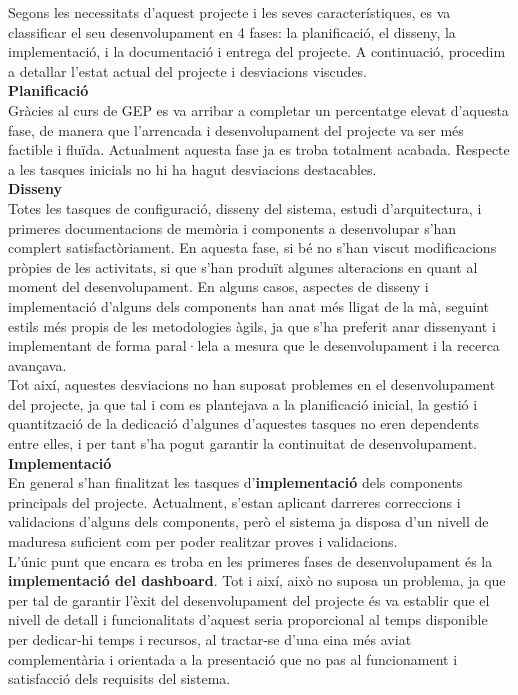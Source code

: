 Segons les necessitats d’aquest projecte i les seves característiques, es va classificar el seu desenvolupament en 4 fases: la planificació, el disseny, la implementació, i la documentació i entrega del projecte. A continuació, procedim a detallar l'estat actual del projecte i desviacions viscudes.\\

\textbf{Planificació}\\

Gràcies al curs de GEP es va arribar a completar un percentatge elevat d'aquesta fase, de manera que l'arrencada i desenvolupament del projecte va ser més factible i fluïda. Actualment aquesta fase ja es troba totalment acabada. Respecte a les tasques inicials no hi ha hagut desviacions destacables.\\

\textbf{Disseny}\\

Totes les tasques de configuració, disseny del sistema, estudi d'arquitectura, i primeres documentacions de memòria i components a desenvolupar s'han complert satisfactòriament. En aquesta fase, si bé no s'han viscut modificacions pròpies de les activitats, si que s'han produït algunes alteracions en quant al moment del desenvolupament. En alguns casos, aspectes de disseny i implementació d'alguns dels components han anat més lligat de la mà, seguint estils més propis de les metodologies àgils, ja que s'ha preferit anar dissenyant i implementant de forma paral·lela a mesura que le desenvolupament i la recerca avançava.\\

Tot així, aquestes desviacions no han suposat problemes en el desenvolupament del projecte, ja que tal i com es plantejava a la planificació inicial, la gestió i quantització de la dedicació d'algunes d'aquestes tasques no eren dependents entre elles, i per tant s'ha pogut garantir la continuitat de desenvolupament.\\

\textbf{Implementació}\\

En general s'han finalitzat les tasques d'\textbf{implementació} dels components principals del projecte. Actualment, s'estan aplicant darreres correccions i validacions d'alguns dels components, però el sistema ja disposa d'un nivell de maduresa suficient com per poder realitzar proves i validacions.\\

L'únic punt que encara es troba en les primeres fases de desenvolupament és la \textbf{implementació del dashboard}. Tot i així, això no suposa un problema, ja que per tal de garantir l'èxit del desenvolupament del projecte és va establir que el nivell de detall i funcionalitats d'aquest seria proporcional al temps disponible per dedicar-hi temps i recursos, al tractar-se d'una eina més aviat complementària i orientada a la presentació que no pas al funcionament i satisfacció dels requisits del sistema.\\

